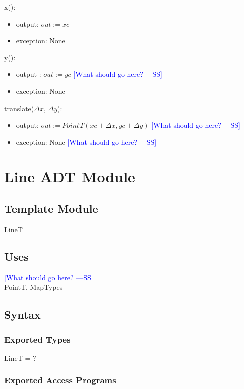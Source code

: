 \documentclass[12pt]{article}
\newcommand{\authornote}[3]{\textcolor{#1}{[#3 ---#2]}}
\newcommand{\authornote}[3]{}
\newcommand{\wss}[1]{\authornote{blue}{SS}{#1}}
\begin{document}
\noindent x():
\begin{itemize}
\item output: $out := xc$
\item exception: None
\end{itemize}

\noindent y():
\begin{itemize}
\item output : $out := yc$  \wss{What should go here?}
\item exception: None
\end{itemize}

\noindent translate($\Delta x$, $\Delta y$):
\begin{itemize}
\item output: $out := PointT(xc + \Delta x, yc + \Delta y)$   \wss{What should go here?}
\item exception: None \wss{What should go here?}
\end{itemize}

\newpage

\section* {Line ADT Module}

\subsection*{Template Module}

LineT

\subsection* {Uses}
\wss{What should go here?}\\
PointT, MapTypes
\subsection* {Syntax}

\subsubsection* {Exported Types}

LineT = ?

\subsubsection* {Exported Access Programs}
\end{document}
